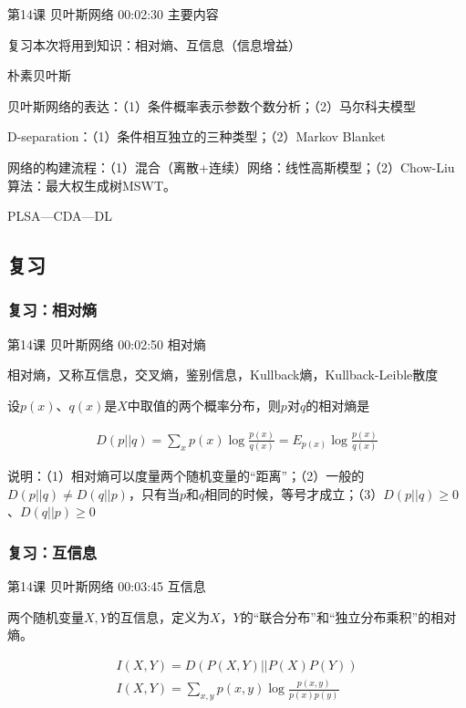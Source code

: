 \documentclass[UTF8]{ctexart}
\begin{document}
第14课 贝叶斯网络 00:02:30 主要内容

复习本次将用到知识：相对熵、互信息（信息增益）

朴素贝叶斯

贝叶斯网络的表达：（1）条件概率表示参数个数分析；（2）马尔科夫模型

D-separation：（1）条件相互独立的三种类型；（2）Markov Blanket

网络的构建流程：（1）混合（离散+连续）网络：线性高斯模型；（2）Chow-Liu算法：最大权生成树MSWT。

PLSA---CDA---DL

\subsection{复习}

\subsubsection{复习：相对熵}

第14课 贝叶斯网络 00:02:50 相对熵

相对熵，又称互信息，交叉熵，鉴别信息，Kullback熵，Kullback-Leible散度

设$p(x)$、$q(x)$是$X$中取值的两个概率分布，则$p$对$q$的相对熵是

\begin{equation}
\begin{aligned}
D(p||q)=\sum_{x}p(x)\log \frac{p(x)}{q(x)}=E_{p(x)}\log \frac{p(x)}{q(x)}
\end{aligned}
\end{equation}

说明：（1）相对熵可以度量两个随机变量的“距离”；（2）一般的$D(p||q) \neq D(q||p)$，只有当$p$和$q$相同的时候，等号才成立；（3）$D(p||q) \geq 0$、$D(q||p) \geq 0$

\subsubsection{复习：互信息}

第14课 贝叶斯网络 00:03:45 互信息

两个随机变量$X,Y$的互信息，定义为$X$，$Y$的“联合分布”和“独立分布乘积”的相对熵。

\begin{equation}
\begin{aligned}
I(X,Y)=D\left (P(X,Y) || P(X)P(Y) \right) \\
I(X,Y)=\sum_{x,y}p(x,y)\log \frac{p(x,y)}{p(x)p(y)}
\end{aligned}
\end{equation}
\end{document}
